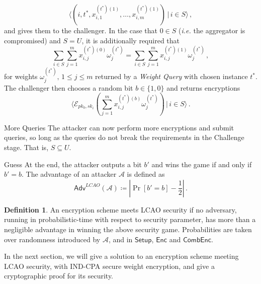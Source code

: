 \documentclass[10pt,journal,compsoc]{IEEEtran}
\theoremstyle{definition}
\newtheorem{definition}{Definition}[section]
\theoremstyle{definition}
\theoremstyle{remark}
\begin{document}
\begin{LaTeXdescription}
    \begin{equation*}
        \langle(i,t^*,x^{(t^*)(1)}_{i,1},\dots,x^{(t^*)(1)}_{i,m})\,|\, i \in S\rangle\,,
    \end{equation*}
    and gives them to the challenger. In the case that $0 \in S$ (\textit{i.e.} the aggregator is compromised) and $S = U$, it is additionally required that
    \begin{equation*}
        \sum_{i\in S}\sum^{m}_{j=1} x^{(t^*)(0)}_{i,j}\omega^{(t^*)}_j = \sum_{i \in S}\sum^{m}_{j=1} x^{(t^*)(1)}_{i,j}\omega^{(t^*)}_j\,,
    \end{equation*}
    for weights $\omega^{(t^*)}_j,\,1\leq j \leq m$ returned by a \textit{Weight Query} with chosen instance $t^*$. The challenger then chooses a random bit $b \in \{1,0\}$ and returns encryptions 
    \begin{equation*}
        \langle\mathcal{E}_{pk_0,sk_i}(\sum^m_{j=1}x^{(t^*)(b)}_{i,j}\omega^{(t^*)}_j)\,|\,i\in S\rangle\,.
    \end{equation*}
    \item[More Queries] The attacker can now perform more encryptions and submit queries, so long as the queries do not break the requirements in the Challenge stage. That is, $S \subseteq U$.
    \item[Guess] At the end, the attacker outputs a bit $b'$ and wins the game if and only if $b' = b$. The advantage of an attacker $\mathcal{A}$ is defined as
    \begin{equation*}
        \mathsf{Adv}^{LCAO}(\mathcal{A}) \coloneqq \left\lvert \Pr [b'=b] - \frac{1}{2}\right\rvert\,.
    \end{equation*} 
\end{LaTeXdescription}

\begin{definition}
    An encryption scheme meets LCAO security if no adversary, running in probabilistic-time with respect to security parameter, has more than a negligible advantage in winning the above security game. Probabilities are taken over randomness introduced by $\mathcal{A}$, and in $\mathsf{Setup}$, $\mathsf{Enc}$ and $\mathsf{CombEnc}$.
\end{definition}

In the next section, we will give a solution to an encryption scheme meeting LCAO security, with IND-CPA secure weight encryption, and give a cryptographic proof for its security.

% 
% 
\end{document}
